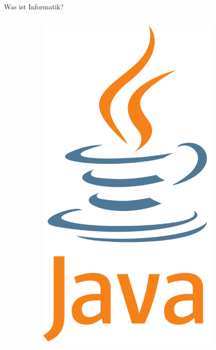\begin{frame}{Was ist Informatik?}
\begin{columns}
\begin{column}{0.4\textwidth}
\begin{figure}
            \begin{subfigure}{0.475\textwidth}
                \centering
                \includegraphics[width=\textwidth,height=0.15\textheight,keepaspectratio]{chapters/02_computer_science/figures/google/programming/languages/java.png}
            \end{subfigure}
            

\end{figure}
\end{column}
\end{columns}
\end{frame}
